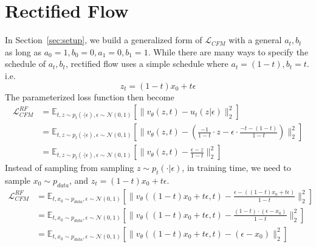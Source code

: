 \section{Rectified Flow}
In Section~\ref{sec:setup}, we build a generalized form of $\mathcal{L}_{CFM}$ with a general $a_t, b_t$ as long as $a_0 = 1, b_0 = 0, a_1 = 0, b_1 = 1$. While there are many ways to specify the schedule of $a_t, b_t$, rectified flow uses a simple schedule where $a_t = (1 - t), b_t = t$. i.e.
\begin{equation}
    z_t = (1 - t) x_0 + t\epsilon
\end{equation}
The parameterized loss function then become
\begin{align}
    \mathcal{L}_{CFM}^{RF} &= \mathbb{E}_{t, z \sim p_t(\cdot \vert \epsilon), \epsilon \sim \mathcal{N}(0, 1)} \left[ \| v_\theta(z, t) - u_t(z \vert \epsilon) \|_2^2 \right]
    \\ &= \mathbb{E}_{t, z \sim p_t(\cdot \vert \epsilon), \epsilon \sim \mathcal{N}(0, 1)} \left[ \| v_\theta(z, t) - \left( \frac{-1}{1 - t} \cdot z - \epsilon \cdot \frac{-t - (1-t)}{1-t} \right) \|_2^2 \right]
    \\ &= \mathbb{E}_{t, z \sim p_t(\cdot \vert \epsilon), \epsilon \sim \mathcal{N}(0, 1)} \left[ \| v_\theta(z, t) - \frac{\epsilon - z}{1 - t} \|_2^2 \right]
\end{align}
Instead of sampling from sampling $z \sim p_t(\cdot \vert \epsilon)$, in training time, we need to sample $x_0 \sim p_{data}$, and $z_t = (1 - t) x_0 + t \epsilon$.
\begin{align}
    \mathcal{L}_{CFM}^{RF} &= \mathbb{E}_{t, x_0 \sim p_{data}, \epsilon \sim \mathcal{N}(0, 1)} \left[ \| v_\theta((1 - t) x_0 + t \epsilon, t) - \frac{\epsilon - ((1 - t) x_0 + t \epsilon)}{1 - t} \|_2^2 \right]
    \\ &= \mathbb{E}_{t, x_0 \sim p_{data}, \epsilon \sim \mathcal{N}(0, 1)} \left[ \| v_\theta((1 - t) x_0 + t \epsilon, t) - \frac{(1 - t) \cdot (\epsilon - x_0)}{1 - t} \|_2^2 \right]
    \\ &= \mathbb{E}_{t, x_0 \sim p_{data}, \epsilon \sim \mathcal{N}(0, 1)} \left[ \| v_\theta((1 - t) x_0 + t \epsilon, t) - (\epsilon - x_0) \|_2^2 \right]
\end{align}